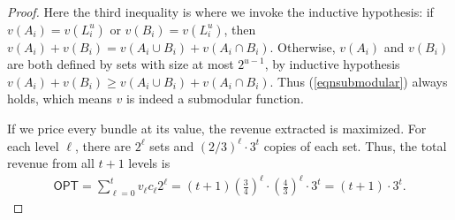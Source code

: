 \begin{proof}
Here the third inequality is where we invoke the inductive hypothesis: if $v(A_i)=v(L_i^u)$ or $v(B_i)=v(L_i^u)$, then $v(A_i)+v(B_i)=v(A_i\cup B_i)+v(A_i\cap B_i)$. Otherwise, $v(A_i)$ and $v(B_i)$ are both defined by sets with size at most $2^{u-1}$, by inductive hypothesis $v(A_i)+v(B_i)\geq v(A_i\cup B_i)+v(A_i\cap B_i)$. Thus (\ref{eqnsubmodular}) always holds, which means $v$ is indeed a submodular function.

If we price every bundle at its value, the revenue extracted is maximized. For each level $\ell$, there are $2^{\ell}$ sets and $(2/3)^{\ell} \cdot 3^{t}$ copies of each set. Thus, the total revenue from all $t+1$ levels is
\begin{align*}
	\textsf{OPT} = \sum_{\ell = 0}^{t} v_\ell c_\ell 2^\ell = (t+1)\left( \frac{3}{4} \right)^{\ell}  \cdot \left( \frac{4}{3} \right)^{\ell} \cdot  3^{t} = (t+1) \cdot 3^{t}.
\end{align*}





\end{proof}
